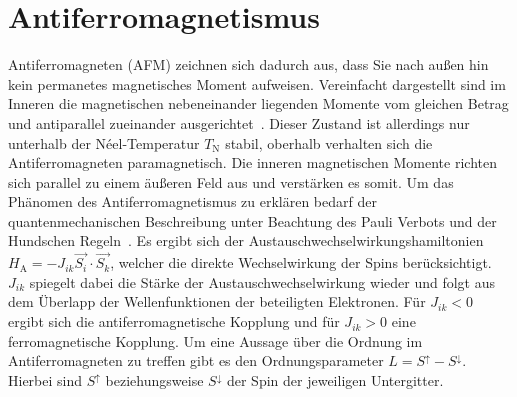     \section{Antiferromagnetismus} \label{sec:AFM}
        Antiferromagneten (AFM) zeichnen sich dadurch aus, dass Sie nach außen hin kein permanetes magnetisches Moment aufweisen.
        Vereinfacht dargestellt sind im Inneren die magnetischen nebeneinander liegenden Momente vom gleichen Betrag und antiparallel zueinander ausgerichtet~\cite{Suter}.
        Dieser Zustand ist allerdings nur unterhalb der Néel-Temperatur $T_\text{N}$ stabil, oberhalb verhalten sich die Antiferromagneten paramagnetisch.
        Die inneren magnetischen Momente richten sich parallel zu einem äußeren Feld aus und verstärken es somit.
        Um das Phänomen des Antiferromagnetismus zu erklären bedarf der quantenmechanischen Beschreibung unter Beachtung des Pauli Verbots und der Hundschen Regeln~\cite{TUChemnitz}.
        Es ergibt sich der Austauschwechselwirkungshamiltonien $H_\text{A} = - J_{ik} \vec{S_i}\cdot\vec{S_k}$, welcher die direkte Wechselwirkung der Spins berücksichtigt.
        $J_{ik}$ spiegelt dabei die Stärke der Austauschwechselwirkung wieder und folgt aus dem Überlapp der Wellenfunktionen der beteiligten Elektronen.
        Für $J_{ik} < 0$ ergibt sich die antiferromagnetische Kopplung und für $J_{ik} > 0$ eine ferromagnetische Kopplung.
        Um eine Aussage über die Ordnung im Antiferromagneten zu treffen gibt es den Ordnungsparameter $L = S^{\uparrow} - S^{\downarrow}$.
        Hierbei sind $S^{\uparrow}$ beziehungsweise $S^{\downarrow}$ der Spin der jeweiligen Untergitter.

